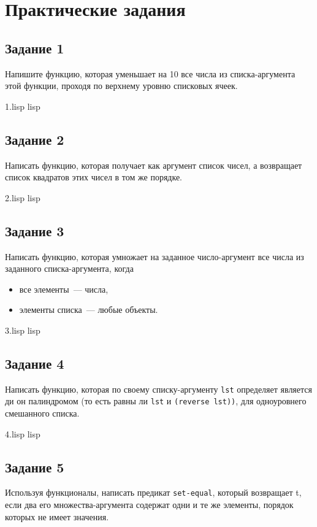 \chapter{Практические задания}

\section{Задание 1}
Напишите функцию, которая уменьшает на 10 все числа из списка-аргумента этой функции, проходя по верхнему уровню списковых ячеек.

{1.lisp}
{lisp}
{}


\section{Задание 2}
Написать функцию, которая получает как аргумент список чисел, а возвращает список квадратов этих чисел в том же порядке.

{2.lisp}
{lisp}
{}


\section{Задание 3}
Написать функцию, которая умножает на заданное число-аргумент все числа из заданного списка-аргумента, когда
\begin{itemize}
	\item все элементы~--- числа,
	\item элементы списка~--- любые объекты.
\end{itemize}

{3.lisp}
{lisp}
{}

\section{Задание 4}
Написать функцию, которая по своему списку-аргументу \texttt{lst} определяет является ди он палиндромом (то есть равны ли \texttt{lst} и \texttt{(reverse lst))}, для одноуровнего смешанного списка.

{4.lisp}
{lisp}
{}

\section{Задание 5}
Используя функционалы, написать предикат \texttt{set-equal}, который возвращает t, если два его множества-аргумента содержат одни и те же элементы, порядок которых не имеет значения.

